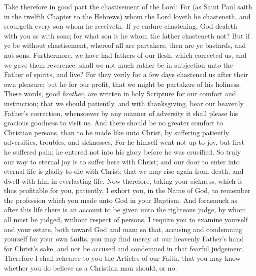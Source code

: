 Take therefore in good part the chastisement of the Lord: For (as Saint Paul saith in the twelfth Chapter to the Hebrews) whom the Lord loveth he chasteneth, and scourgeth every son whom he receiveth. If ye endure chastening, God dealeth with you as with sons; for what son is he whom the father chasteneth not? But if ye be without chastisement, whereof all are partakers, then are ye bastards, and not sons. Furthermore, we have had fathers of our flesh, which corrected us, and we gave them reverence: shall we not much rather be in subjection unto the Father of spirits, and live? For they verily for a few days chastened us after their own pleasure; but he for our profit, that we might be partakers of his holiness. These words, good \emph{brother}, are written in holy Scripture for our comfort and instruction; that we should patiently, and with thanksgiving, bear our heavenly Father’s correction, whensoever by any manner of adversity it shall please his gracious goodness to visit us. And there should be no greater comfort to Christian persons, than to be made like unto Christ, by suffering patiently adversities, troubles, and sicknesses. For he himself went not up to joy, but first he suffered pain; he entered not into his glory before he was crucified. So truly our way to eternal joy is to suffer here with Christ; and our door to enter into eternal life is gladly to die with Christ; that we may rise again from death, and dwell with him in everlasting life. Now therefore, taking your sickness, which is thus profitable for you, patiently, I exhort you, in the Name of God, to remember the profession which you made unto God in your Baptism. And forasmuch as after this life there is an account to be given unto the righteous judge, by whom all must be judged, without respect of persons, I require you to examine yourself and your estate, both toward God and man; so that, accusing and condemning yourself for your own faults, you may find mercy at our heavenly Father’s hand for Christ’s sake, and not be accused and condemned in that fearful judgement. Therefore I shall rehearse to you the Articles of our Faith, that you may know whether you do believe as a Christian man should, or no.

\medskip
{\centering{}\par}

\medskip

